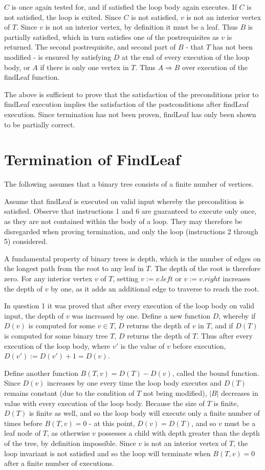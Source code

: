 \documentclass{article}
\begin{document}
$C$ is once again tested for, and if satisfied the loop body again executes. If
$C$ is not satisfied, the loop is exited. Since $C$ is not satisfied, $v$ is not
an interior vertex of $T$. Since $v$ is not an interior vertex, by definition it
must be a leaf. Thus $B$ is partially satisfied, which in turn satisfies one of
the postrequisites as $v$ is returned. The second postrequisite, and second
part of $B$ - that $T$ has not been modified - is ensured by satisfying $D$ at
the end of every execution of the loop body, or $A$ if there is only one vertex
in $T$. Thus $A \Rightarrow B$ over execution of the findLeaf function.

The above is sufficient to prove that the satisfaction of the preconditions
prior to findLeaf execution implies the satisfaction of the postconditions
after findLeaf execution. Since termination has not been proven, findLeaf has
only been shown to be partially correct.

\section{Termination of FindLeaf}

The following assumes that a binary tree consists of a finite number of
vertices.

Assume that findLeaf is executed on valid input whereby the precondition is
satisfied. Observe that instructions 1 and 6 are guaranteed to execute only
once, as they are not contained within the body of a loop. They may therefore
be disregarded when proving termination, and only the loop (instructions 2
through 5) considered.

A fundamental property of binary trees is depth, which is the number of edges
on the longest path from the root to any leaf in $T$. The depth of the root
is therefore zero. For any interior vertex $v$ of $T$, setting $v:=v.left$ or
$v:=v.right$ increases the depth of $v$ by one, as it adds an additional edge
to traverse to reach the root.

In question 1 it was proved that after every execution of the loop
body on valid input, the depth of $v$ was increased by one. Define a new
function $D$, whereby if $D(v)$ is computed for some $v \in T$, $D$ returns the
depth of $v$ in $T$, and if $D(T)$ is computed for some binary tree $T$, $D$
returns the depth of $T$. Thus after every execution of the loop body, where
$v'$ is the value of $v$ before execution, $D(v'):=D(v')+1=D(v)$.

Define another function $B(T,v) = D(T) - D(v)$, called the bound function. Since
$D(v)$ increases by one every time the loop body executes and $D(T)$ remains
constant (due to the condition of $T$ not being modified), $|B|$ decreases in
value with every execution of the loop body. Because the size of $T$ is finite,
$D(T)$ is finite as well, and so the loop body will execute only a finite
number of times before $B(T,v) = 0$ - at this point, $D(v) = D(T)$, and so $v$
must be a leaf node of $T$, as otherwise $v$ possesses a child with depth
greater than the depth of the tree, by definition impossible. Since $v$ is not
an interior vertex of $T$, the loop invariant is not satisfied and so the loop
will terminate when $B(T,v) = 0$ after a finite number of executions.
\end{document}
